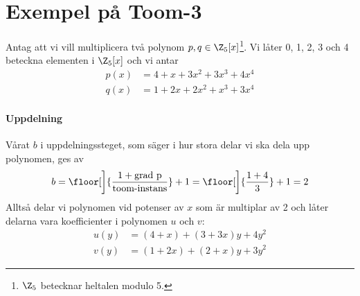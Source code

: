\section{Exempel på Toom-3}

Antag att vi vill multiplicera två polynom $p, q \in
\Z_5[x]$\footnote{$\Z_5$ betecknar heltalen modulo 5.}. Vi
låter 0, 1, 2, 3 och 4 beteckna elementen i $\Z_5[x]$ och vi antar
\begin{align*}
  p(x) &= 4+x+3x^2+3x^3+4x^4 \\
  q(x) &= 1+2x+2x^2+x^3+3x^4
\end{align*}

\paragraph{Uppdelning}
Vårat $b$ i uppdelningssteget, som säger i hur stora delar vi ska dela upp
polynomen, ges av
\begin{equation*}
  b = \floor[\bigg]{\frac{1 + \mbox{grad p}}{\mbox{toom-instans}}} + 1 = \floor[\bigg]{\frac{1 + 4}{3}} + 1 = 2
\end{equation*}
Alltså delar vi polynomen vid potenser av $x$ som är multiplar av 2 och låter
delarna vara koefficienter i polynomen $u$ och $v$:
\begin{align*}
  u(y) &= (4+x)+(3 + 3x)y+ 4y^2 \\
  v(y) &= (1 + 2x)+ (2 + x)y + 3y^2
\end{align*}

